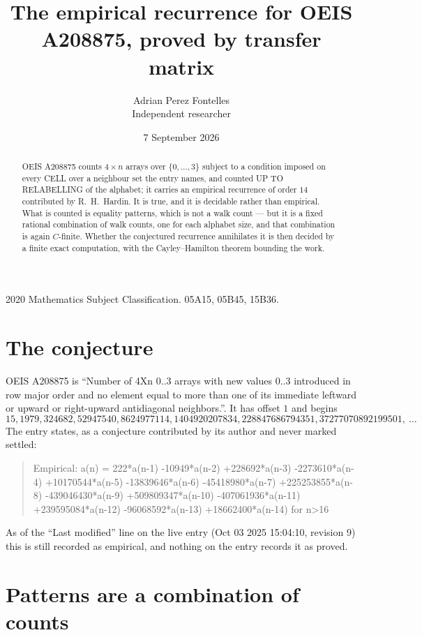 \documentclass[11pt,a4paper]{article}
\title{The empirical recurrence for OEIS A208875, proved by transfer matrix}
\author{Adrian Perez Fontelles\\ \small Independent researcher}
\date{7 September 2026}
\theoremstyle{plain}
\theoremstyle{definition}
\begin{document}
\maketitle

\begin{abstract}
OEIS A208875 counts $4\times n$ arrays over $\{0,\dots,3\}$ subject to a condition imposed on
every CELL over a neighbour set the entry names, and counted UP TO RELABELLING of the
alphabet; it carries an empirical recurrence of order $14$ contributed by
R.~H.~Hardin. It is true, and it is decidable rather than empirical. What is counted is
equality patterns, which is not a walk count --- but it is a fixed rational combination of
walk counts, one for each alphabet size, and that combination is again $C$-finite. Whether the
conjectured recurrence annihilates it is then decided by a finite exact computation, with the
Cayley--Hamilton theorem bounding the work.
\end{abstract}

\noindent\small 2020 Mathematics Subject Classification. 05A15, 05B45, 15B36.\normalsize

\section{The conjecture}

OEIS A208875 is ``Number of 4Xn 0..3 arrays with new values 0..3 introduced in row major order and no element equal to more than one of its immediate leftward or upward or right-upward antidiagonal neighbors.''. It has offset $1$ and begins
\[
15, 1979, 324682, 52947540, 8624977114, 1404920207834, 228847686794351, 37277070892199501,\ \dots
\]
The entry states, as a conjecture contributed by its author and never marked settled:
\begin{quote}
Empirical: a(n) = 222*a(n-1) -10949*a(n-2) +228692*a(n-3) -2273610*a(n-4) +10170544*a(n-5) -13839646*a(n-6) -45418980*a(n-7) +225253855*a(n-8) -439046430*a(n-9) +509809347*a(n-10) -407061936*a(n-11) +239595084*a(n-12) -96068592*a(n-13) +18662400*a(n-14) for n>16
\end{quote}
As of the ``Last modified'' line on the live entry (Oct 03 2025 15:04:10, revision 9) this is still
recorded as empirical, and nothing on the entry records it as proved.

\section{Patterns are a combination of counts}
\end{document}
